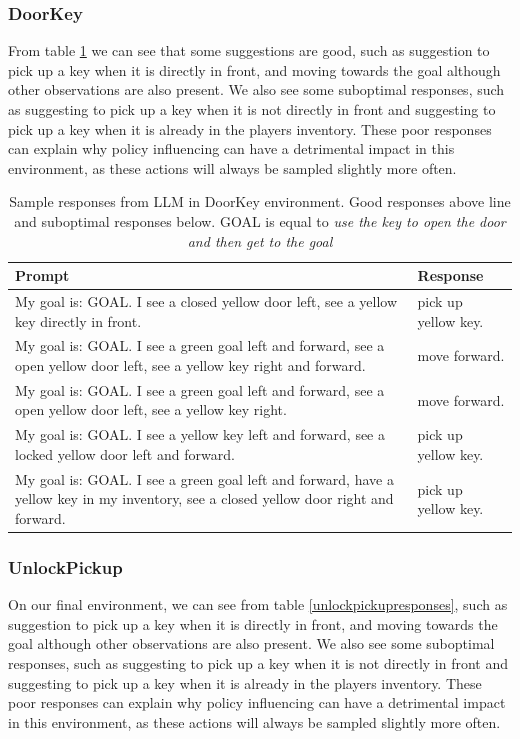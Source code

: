 \documentclass[conference]{IEEEtran}
\begin{document}
\subsubsection{DoorKey}

From table \ref{doorkeyresponses} we can see that some suggestions are good, such as suggestion to pick up a key when it is directly in front, and moving towards the goal although other observations are also present. We also see some suboptimal responses, such as suggesting to pick up a key when it is not directly in front and suggesting to pick up a key when it is already in the players inventory. These poor responses can explain why policy influencing can have a detrimental impact in this environment, as these actions will always be sampled slightly more often.

\begin{table}[h]
\caption{Sample responses from LLM in DoorKey environment. Good responses above line and suboptimal responses below. GOAL is equal to {\it use the key to open the door and then get to the goal}}
\begin{center}
\label{doorkeyresponses}
\begin{tabularx}{3.25in}{X | X}
Prompt & Response \\
\hline
My goal is: GOAL. I see a closed yellow door left, see a yellow key directly in front. & pick up yellow key. \\
My goal is: GOAL. I see a green goal left and forward, see a open yellow door left, see a yellow key right and forward. & move forward. \\
My goal is: GOAL. I see a green goal left and forward, see a open yellow door left, see a yellow key right. & move forward. \\
\hline
My goal is: GOAL. I see a yellow key left and forward, see a locked yellow door left and forward. & pick up yellow key. \\
My goal is: GOAL. I see a green goal left and forward, have a yellow key in my inventory, see a closed yellow door right and forward. & pick up yellow key.
\end{tabularx}
\end{center}
\end{table}

\subsubsection{UnlockPickup}

On our final environment, we can see from table \ref{unlockpickupresponses}, such as suggestion to pick up a key when it is directly in front, and moving towards the goal although other observations are also present. We also see some suboptimal responses, such as suggesting to pick up a key when it is not directly in front and suggesting to pick up a key when it is already in the players inventory. These poor responses can explain why policy influencing can have a detrimental impact in this environment, as these actions will always be sampled slightly more often.
\end{document}

